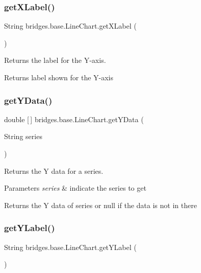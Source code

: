 \subsubsection{\texorpdfstring{get\+X\+Label()}{getXLabel()}}
{\footnotesize\ttfamily String bridges.\+base.\+Line\+Chart.\+get\+X\+Label (\begin{DoxyParamCaption}{ }\end{DoxyParamCaption})}



Returns the label for the Y-\/axis. 

\begin{DoxyReturn}{Returns}
label shown for the Y-\/axis 
\end{DoxyReturn}
\mbox{\label{classbridges_1_1base_1_1_line_chart_a2bf257f45c1056808b41581af1f83645}} 
\subsubsection{\texorpdfstring{get\+Y\+Data()}{getYData()}}
{\footnotesize\ttfamily double \mbox{[}$\,$\mbox{]} bridges.\+base.\+Line\+Chart.\+get\+Y\+Data (\begin{DoxyParamCaption}\item[{String}]{series }\end{DoxyParamCaption})}



Returns the Y data for a series. 


\begin{DoxyParams}{Parameters}
{\em series} & indicate the series to get \\
\hline
\end{DoxyParams}
\begin{DoxyReturn}{Returns}
the Y data of series or null if the data is not in there 
\end{DoxyReturn}
\mbox{\label{classbridges_1_1base_1_1_line_chart_ad3ae17da720b1f89406ab742379ddfd6}} 
\subsubsection{\texorpdfstring{get\+Y\+Label()}{getYLabel()}}
{\footnotesize\ttfamily String bridges.\+base.\+Line\+Chart.\+get\+Y\+Label (\begin{DoxyParamCaption}{ }\end{DoxyParamCaption})}



